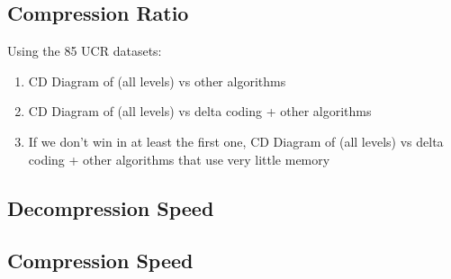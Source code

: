 

\subsection{Compression Ratio}

Using the 85 UCR datasets:
\begin{enumerate}
\item CD Diagram of \mine (all levels) vs other algorithms
\item CD Diagram of \mine (all levels) vs delta coding + other algorithms
\item If we don't win in at least the first one, CD Diagram of \mine (all levels) vs delta coding + other algorithms that use very little memory
\end{enumerate}




\subsection{Decompression Speed}


\subsection{Compression Speed}

